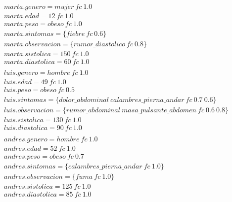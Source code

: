 \documentclass[10pt, a4paper,spanish]{article}
\begin{document}
			\begin{equation*}
				\begin{split}
					marta.genero=mujer \ fc \  1.0 \\
					marta.edad=12 \ fc \  1.0 \\
					marta.peso=obeso \ fc \  1.0 \\
					marta.sintomas=\{fiebre \ fc \  0.6\} \\
					marta.observacion=\{rumor\_diastolico \ fc \  0.8\} \\
					marta.sistolica=150 \ fc \  1.0 \\
					marta.diastolica=60 \ fc \  1.0\\
					\\
					luis.genero=hombre  \ fc \  1.0 \\
					luis.edad=49  \ fc \   1.0 \\
					luis.peso=obeso \ fc \  0.5 \\
					luis.sintomas=\{dolor\_abdominal \ calambres\_pierna\_andar \ fc \  0.7 \ 0.6\} \\
					luis.observacion=\{rumor\_abdominal \ masa\_pulsante\_abdomen \ fc \  0.6 \ 0.8\} \\
					luis.sistolica=130 \ fc \  1.0 \\
					luis.diastolica=90 \ fc \  1.0 \\
					\\
					andres.genero=hombre \ fc \  1.0 \\
					andres.edad=52 \ fc \  1.0 \\
					andres.peso=obeso \ fc \  0.7 \\
					andres.sintomas=\{calambres\_pierna\_andar \ fc \  1.0 \} \\
					andres.observacion=\{fuma \ fc \  1.0\} \\
					andres.sistolica=125 \ fc \  1.0 \\
					andres.diastolica=85 \ fc \  1.0 \\
				\end{split}
			\end{equation*}
\end{document}
